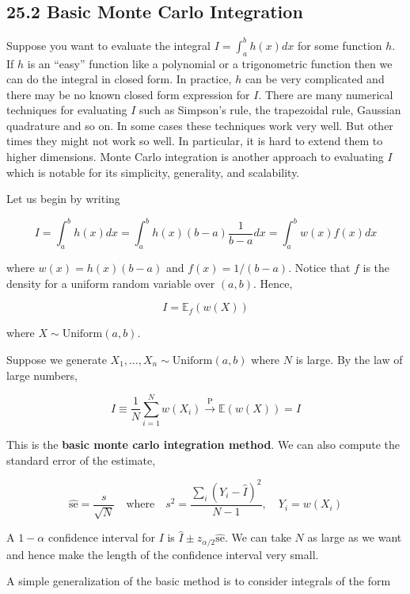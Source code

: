 \subsection*{25.2 Basic Monte Carlo Integration}\label{basic-monte-carlo-integration}

Suppose you want to evaluate the integral \(I = \int_a^{b} h(x) dx\) for
some function \(h\). If \(h\) is an ``easy'' function like a polynomial
or a trigonometric function then we can do the integral in closed form.
In practice, \(h\) can be very complicated and there may be no known
closed form expression for \(I\). There are many numerical techniques
for evaluating \(I\) such as Simpson's rule, the trapezoidal rule,
Gaussian quadrature and so on. In some cases these techniques work very
well. But other times they might not work so well. In particular, it is
hard to extend them to higher dimensions. Monte Carlo integration is
another approach to evaluating \(I\) which is notable for its
simplicity, generality, and scalability.

Let us begin by writing

\[ I = \int_a^{b} h(x) dx = \int_a^{b} h(x) (b - a) \frac{1}{b - a} dx = \int_a^{b} w(x) f(x) dx\]

where \(w(x) = h(x)(b - a)\) and \(f(x) = 1 / (b - a)\). Notice that
\(f\) is the density for a uniform random variable over \((a, b)\).
Hence,

\[ I = \mathbb{E}_f(w(X)) \]

where \(X \sim \text{Uniform}(a, b)\).

Suppose we generate \(X_{1}, \dots, X_{n} \sim \text{Uniform}(a, b)\) where
\(N\) is large. By the law of large numbers,

\[ \hat{I} \equiv \frac{1}{N} \sum_{i=1}^N w(X_{i}) \xrightarrow{\text{P}} \mathbb{E}(w(X)) = I \]

This is the \textbf{basic monte carlo integration method}. We can also
compute the standard error of the estimate,

\[ \hat{\text{se}} = \frac{s}{\sqrt{N}} 
\quad \text{where} \quad
s^{2} = \frac{\sum_{i} (Y_{i} - \hat{I})^{2}}{N - 1},
\quad Y_{i} = w(X_{i})
\]

A \(1 - \alpha\) confidence interval for \(I\) is
\(\hat{I} \pm z_{\alpha / 2} \hat{\text{se}}\). We can take \(N\) as
large as we want and hence make the length of the confidence interval
very small.

A simple generalization of the basic method is to consider integrals of
the form

